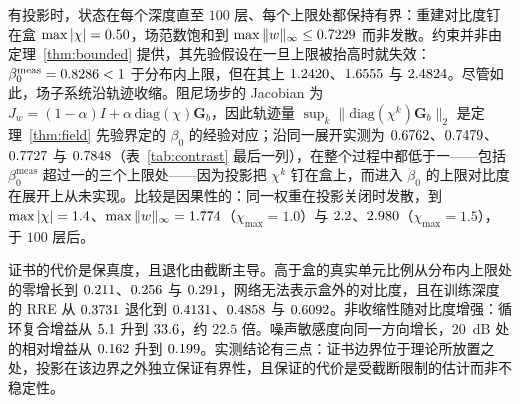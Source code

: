 \documentclass[UTF8,a4paper,11pt]{ctexart}
\newcommand{\norm}[1]{\lVert #1 \rVert}
\newcommand{\numv}[1]{#1}
\begin{document}
有投影时，状态在每个深度直至 $100$ 层、每个上限处都保持有界：重建对比度钉在盒 $\max|\chi|=\numv{\NumMaxChiBox}$，场范数饱和到 $\max\|w\|_\infty\le\numv{\NumMaxWOneFive}$ 而非发散。约束并非由定理~\ref{thm:bounded} 提供，其先验假设在一旦上限被抬高时就失效：$\beta_0^{\mathrm{meas}}=\numv{\NumBetaZeroFive}<1$ 于分布内上限，但在其上 $\numv{\NumBetaSevenFive}$、$\numv{\NumBetaOneZero}$ 与 $\numv{\NumBetaOneFive}$。尽管如此，场子系统沿轨迹收缩。阻尼场步的 Jacobian 为 $J_w=(1-\alpha)I+\alpha\,\mathrm{diag}(\chi)\mathbf G_b$，因此轨迹量 $\sup_k\norm{\mathrm{diag}(\chi^k)\mathbf G_b}_2$ 是定理~\ref{thm:field} 先验界定的 $\beta_0$ 的经验对应；沿同一展开实测为 $\numv{\NumFieldSubCertZeroFive}$、$\numv{\NumFieldSubCertSevenFive}$、$\numv{\NumFieldSubCertOneZero}$ 与 $\numv{\NumFieldSubCertOneFive}$（表~\ref{tab:contrast} 最后一列），在整个过程中都低于一——包括 $\beta_0^{\mathrm{meas}}$ 超过一的三个上限处——因为投影把 $\chi^k$ 钉在盒上，而进入 $\beta_0$ 的上限对比度在展开上从未实现。比较是因果性的：同一权重在投影关闭时发散，到 $\max|\chi|=\numv{\NumProjOffChiOneZero}$、$\max\|w\|_\infty=\numv{\NumProjOffWOneZero}$（$\chi_{\max}=1.0$）与 $\numv{\NumProjOffChiOneFive}$、$\numv{\NumProjOffWOneFive}$（$\chi_{\max}=1.5$），于 $100$ 层后。

证书的代价是保真度，且退化由截断主导。高于盒的真实单元比例从分布内上限处的零增长到 $\numv{\NumFracBoxSevenFive}$、$\numv{\NumFracBoxOneZero}$ 与 $\numv{\NumFracBoxOneFive}$，网络无法表示盒外的对比度，且在训练深度的 RRE 从 $\numv{\NumRreZeroFive}$ 退化到 $\numv{\NumRreSevenFive}$、$\numv{\NumRreOneZero}$ 与 $\numv{\NumRreOneFive}$。非收缩性随对比度增强：循环复合增益从 $\numv{\NumCycGainZeroFive}$ 升到 $\numv{\NumCycGainOneFive}$，约 $22.5$ 倍。噪声敏感度向同一方向增长，$20$~dB 处的相对增益从 $\numv{\NumSensZeroFive}$ 升到 $\numv{\NumSensOneFive}$。实测结论有三点：证书边界位于理论所放置之处，投影在该边界之外独立保证有界性，且保证的代价是受截断限制的估计而非不稳定性。
\end{document}
